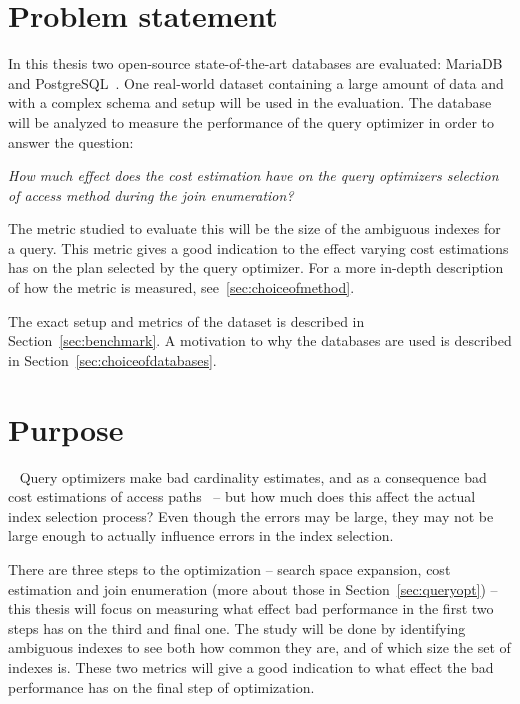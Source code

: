 \section{Problem statement}
In this thesis two open-source state-of-the-art databases are evaluated: MariaDB~\cite{mariadb_m} and PostgreSQL~\cite{postgresql_ptwmaosd}. One real-world dataset containing a large amount of data and with a complex schema and setup will be used in the evaluation. The database will be analyzed to measure the performance of the query optimizer in order to answer the question:

\textit{How much effect does the cost estimation have on the query optimizers
  selection of access method during the join enumeration?}

The metric studied to evaluate this will be the size of the ambiguous indexes for a query. This metric gives a good indication to the effect varying cost estimations has on the plan selected by the query optimizer. For a more in-depth description of how the metric is measured, see~\ref{sec:choiceofmethod}.

The exact setup and metrics of the dataset is described in Section~\ref{sec:benchmark}. A motivation to why the databases are used is described in Section~\ref{sec:choiceofdatabases}.

\section{Purpose}~\label{sec:purpose}
Query optimizers make bad cardinality estimates, and as a consequence bad cost estimations of access paths~\cite{leis_2015_how_hgaqor} – but how much does this affect the actual index selection process? Even though the errors may be large, they may not be large enough to actually influence errors in the index selection.

There are three steps to the optimization – search space expansion, cost estimation and join enumeration (more about those in Section~\ref{sec:queryopt}) – this thesis will focus on measuring what effect bad performance in the first two steps has on the third and final one. The study will be done by identifying ambiguous indexes to see both how common they are, and of which size the set of indexes is. These two metrics will give a good indication to what effect the bad performance has on the final step of optimization.

